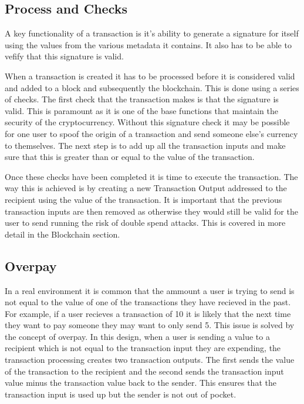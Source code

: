 \documentclass{l4proj}
\begin{document}
\subsection{Process and Checks}
A key functionality of a transaction is it's ability to generate a signature for itself using the values
from the various metadata it contains. It also has to be able to vefify that this signature is valid.

When a transaction is created it has to be processed before it is considered valid and added to a block and subsequently
the blockchain. This is done using a series of checks. The first check that the transaction makes is that the
signature is valid. This is paramount as it is one of the base functions that maintain the security of the 
cryptocurrency. Without this signature check it may be possible for one user to spoof the origin of a transaction
and send someone else's currency to themselves. The next step is to add up all the transaction inputs
and make sure that this is greater than or equal to the value of the transaction.

Once these checks have been completed it is time to execute the transaction. The way this is achieved is by
creating a new Transaction Output addressed to the recipient using the value of the transaction. It is important
that the previous transaction inputs are then removed as otherwise they would still be valid for the user to send
running the risk of double spend attacks. This is covered in more detail in the Blockchain section.

\subsection{Overpay}
In a real environment it is common that the ammount a user is trying to send is not equal to the value of one of
the transactions they have recieved in the past. For example, if a user recieves a transaction of 10 it is likely
that the next time they want to pay someone they may want to only send 5. This issue is solved by the concept of
overpay. In this design, when a user is sending a value to a recipient which is not equal to the transaction
input they are expending, the transaction processing creates two transaction outputs. The first sends the value
of the transaction to the recipient and the second sends the transaction input value minus the transaction value
back to the sender. This ensures that the transaction input is used up but the sender is not out of pocket.
\end{document}
